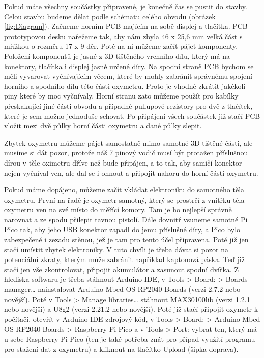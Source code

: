 \par Pokud máte všechny součástky připravené, je konečně čas se pustit do stavby. Celou stavbu budeme dělat podle schématu celého obvodu (obrázek \ref{fig:Diagram}). Začneme horním PCB majícím na sobě displej a tlačítka. PCB prototypovou desku nařežeme tak, aby nám zbyla 46 x 25,6 mm velká část s mřížkou o rozměru 17 x 9 děr. Poté na ni můžeme začít pájet komponenty. Položení komponentů je jasné z 3D tištěného vrchního dílu, který má na konektory, tlačítka i displej jasně určené díry. Na spodní straně PCB bychom se měli vyvarovat vyčnívajícím věcem, které by mohly zabránit správnému spojení horního a spodního dílu této části oxymetru. Proto je vhodné zkrátit jakékoli piny které by moc vyčnívaly. Horní stranu zato můžeme použít pro kabílky přeskakující jiné části obvodu a případně pullupové rezistory pro dvě z tlačítek, které je sem možno jednoduše schovat. Po připájení všech součástek již stačí PCB vložit mezi dvě půlky horní části oxymetru a dané půlky slepit.
\par Zbytek oxymetru můžeme pájet samostatně mimo samotné 3D tištěné části, ale musíme si dát pozor, protože náš 7 pinový vodič musí být protažen příslušnou dírou v těle oximetru dříve než bude připájen, a to tak, aby samičí konektor nejen vyčníval ven, ale dal se i ohnout a připojit nahoru do horní části oxymetru.
\par Pokud máme dopájeno, můžeme začít vkládat elektroniku do samotného těla oxymetru. První na řadě je oxymetr samotný, který se prostrčí z vnitřku těla oxymetru ven na své místo do měřící komory. Tam je ho nejlepší správně narovnat a ze spodu přilepit tavnou pistolí. Dále dovnitř vsuneme samotné Pi Pico tak, aby jeho USB konektor zapadl do jemu příslušné díry, a Pico bylo zabezpečené i zezadu stěnou, jež je tam pro tento účel připravena. Poté již jen stačí umístit zbytek elektroniky. V tuto chvíli je třeba dávat si pozor na potenciální zkraty, kterým může zabránit například kaptonová páska. Teď již stačí jen vše zkontrolovat, připojit akumulátor a zasunout spodní dvířka.
Z hlediska softwaru je třeba stáhnout Arduino IDE, v Tools > Board: > Boards manager… nainstalovat Arduino Mbed OS RP2040 Boards (verzi 2.7.2 nebo novější). Poté v Tools > Manage libraries… stáhnout MAX30100lib (verzi 1.2.1 nebo novější) a U8g2 (verzi 2.21.2 nebo novější). Poté již stačí připojit oxymetr k počítači, otevřít v Arduino IDE zdrojový kód, v Tools > Board: > Arduino Mbed OS RP2040 Boards > Raspberry Pi Pico a v Tools > Port: vybrat ten, který má u sebe Raspberry Pi Pico (ten je také potřeba znát pro případ využití programu pro stažení dat z oxymetru) a kliknout na tlačítko Upload (šipka doprava).
